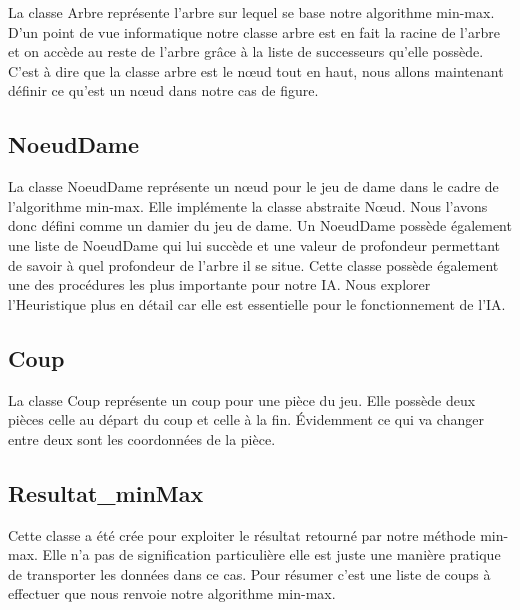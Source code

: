 \documentclass[12,french]{report}
\begin{document}
La classe Arbre représente l'arbre sur lequel se base notre algorithme min-max. D'un point de vue informatique notre classe arbre est en fait la racine de l'arbre et on accède au reste de l'arbre grâce à la liste de successeurs qu'elle possède. C'est à dire que la classe arbre est le nœud tout en haut, nous allons maintenant définir ce qu'est un nœud dans notre cas de figure.

\subsection{NoeudDame}

La classe NoeudDame représente un nœud pour le jeu de dame dans le cadre de l'algorithme min-max. Elle implémente la classe abstraite Nœud. Nous l'avons donc défini comme un damier du jeu de dame. Un NoeudDame possède également une liste de NoeudDame qui lui succède et une valeur de profondeur permettant de savoir à quel profondeur de l'arbre il se situe. Cette classe possède également une des procédures les plus importante pour notre IA. Nous explorer l'Heuristique plus en détail car elle est essentielle pour le fonctionnement de l'IA.

\subsection{Coup}

La classe Coup représente un coup pour une pièce du jeu. Elle possède deux pièces celle au départ du coup et celle à la fin. Évidemment ce qui va changer entre deux sont les coordonnées de la pièce.

\subsection{Resultat\_minMax}

Cette classe a été crée pour exploiter le résultat retourné par notre méthode min-max. Elle n'a pas de signification particulière elle est juste une manière pratique de transporter les données dans ce cas. Pour résumer c'est une liste de coups à effectuer que nous renvoie notre algorithme min-max.
\end{document}
